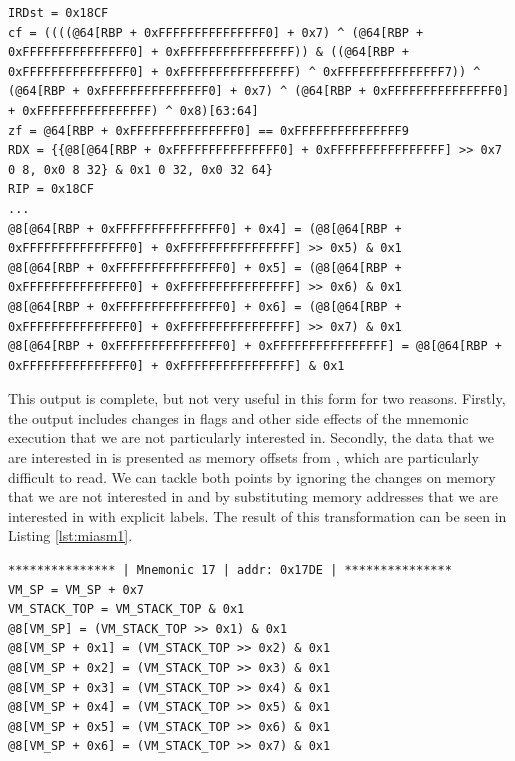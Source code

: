 \begin{lstlisting}[label={lst:miasm0}, caption={Partial result of symbolically executing a function handler in Miasm. One will notice the state change in core registers such as \cc{RDX}, flag changes, as well as changes in memory.}]
IRDst = 0x18CF
cf = ((((@64[RBP + 0xFFFFFFFFFFFFFFF0] + 0x7) ^ (@64[RBP + 0xFFFFFFFFFFFFFFF0] + 0xFFFFFFFFFFFFFFFF)) & ((@64[RBP + 0xFFFFFFFFFFFFFFF0] + 0xFFFFFFFFFFFFFFFF) ^ 0xFFFFFFFFFFFFFFF7)) ^ (@64[RBP + 0xFFFFFFFFFFFFFFF0] + 0x7) ^ (@64[RBP + 0xFFFFFFFFFFFFFFF0] + 0xFFFFFFFFFFFFFFFF) ^ 0x8)[63:64]
zf = @64[RBP + 0xFFFFFFFFFFFFFFF0] == 0xFFFFFFFFFFFFFFF9
RDX = {{@8[@64[RBP + 0xFFFFFFFFFFFFFFF0] + 0xFFFFFFFFFFFFFFFF] >> 0x7 0 8, 0x0 8 32} & 0x1 0 32, 0x0 32 64}
RIP = 0x18CF
...
@8[@64[RBP + 0xFFFFFFFFFFFFFFF0] + 0x4] = (@8[@64[RBP + 0xFFFFFFFFFFFFFFF0] + 0xFFFFFFFFFFFFFFFF] >> 0x5) & 0x1
@8[@64[RBP + 0xFFFFFFFFFFFFFFF0] + 0x5] = (@8[@64[RBP + 0xFFFFFFFFFFFFFFF0] + 0xFFFFFFFFFFFFFFFF] >> 0x6) & 0x1
@8[@64[RBP + 0xFFFFFFFFFFFFFFF0] + 0x6] = (@8[@64[RBP + 0xFFFFFFFFFFFFFFF0] + 0xFFFFFFFFFFFFFFFF] >> 0x7) & 0x1
@8[@64[RBP + 0xFFFFFFFFFFFFFFF0] + 0xFFFFFFFFFFFFFFFF] = @8[@64[RBP + 0xFFFFFFFFFFFFFFF0] + 0xFFFFFFFFFFFFFFFF] & 0x1
\end{lstlisting}


This output is complete, but not very useful in this form for two reasons. Firstly, the output includes changes in flags and other side effects of the mnemonic execution that we are not particularly interested in. Secondly, the data that we are interested in is presented as memory offsets from , which are particularly difficult to read. We can tackle both points by ignoring the changes on memory that we are not interested in and by substituting memory addresses that we are interested in with explicit labels. The result of this transformation can be seen in Listing \ref{lst:miasm1}.

\begin{lstlisting}[label={lst:miasm1}, caption={Result of symbolically executing the same function handler as in Listing \ref{lst:miasm0} with some cleanup. We only chose to display the change in relevant registers and memory locations. Additionally, we introduced labels for better clarity.}]
*************** | Mnemonic 17 | addr: 0x17DE | ***************
VM_SP = VM_SP + 0x7
VM_STACK_TOP = VM_STACK_TOP & 0x1
@8[VM_SP] = (VM_STACK_TOP >> 0x1) & 0x1
@8[VM_SP + 0x1] = (VM_STACK_TOP >> 0x2) & 0x1
@8[VM_SP + 0x2] = (VM_STACK_TOP >> 0x3) & 0x1
@8[VM_SP + 0x3] = (VM_STACK_TOP >> 0x4) & 0x1
@8[VM_SP + 0x4] = (VM_STACK_TOP >> 0x5) & 0x1
@8[VM_SP + 0x5] = (VM_STACK_TOP >> 0x6) & 0x1
@8[VM_SP + 0x6] = (VM_STACK_TOP >> 0x7) & 0x1
\end{lstlisting}

